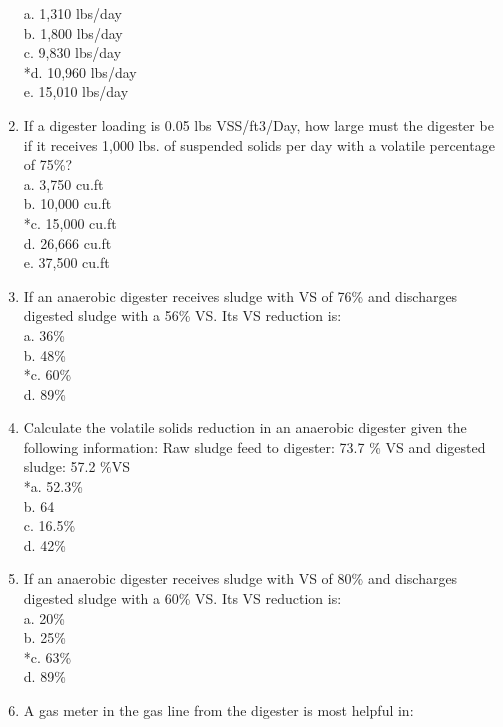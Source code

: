 \documentclass{article}
\begin{document}
\begin{enumerate}
a. 1,310 lbs/day \\
b. 1,800 lbs/day \\
c. 9,830 lbs/day \\
*d. 10,960 lbs/day \\
e. 15,010 lbs/day \\

\item  If a digester loading is 0.05 lbs VSS/ft3/Day, how large must the digester be if it receives 1,000 lbs. of suspended solids per day with a volatile percentage of 75\%? \\

a. 3,750 cu.ft \\
b. 10,000 cu.ft \\
*c. 15,000 cu.ft \\
d. 26,666 cu.ft \\
e. 37,500 cu.ft \\

\item  If an anaerobic digester receives sludge with VS of 76\% and discharges digested sludge with a 56\% VS.  Its VS reduction is: \\

a. 36\% \\
b. 48\% \\
*c. 60\% \\
d. 89\% \\

\item  Calculate the volatile solids reduction in an anaerobic digester given the following information:  Raw sludge feed to digester:  73.7 \% VS and digested sludge: 57.2 \%VS \\

*a. 52.3\% \\
b. 64 \\
c. 16.5\% \\
d. 42\% \\

\item  If an anaerobic digester receives sludge with VS of 80\% and discharges digested sludge with a 60\% VS.  Its VS reduction is: \\

a. 20\% \\
b. 25\% \\
*c. 63\% \\
d. 89\% \\

\item  A gas meter in the gas line from the digester is most helpful in: \\


\end{enumerate}
\end{document}
